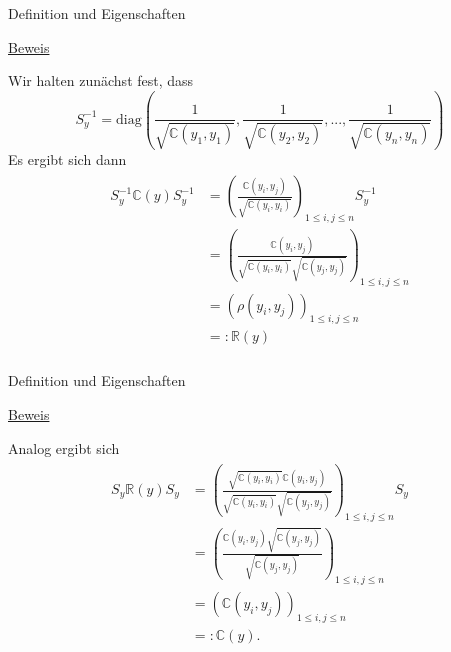 \documentclass[
  8pt,
  ignorenonframetext,
]{beamer}
\begin{document}
\begin{frame}{Definition und Eigenschaften}
\protect\hypertarget{definition-und-eigenschaften-2}{}
\footnotesize

\underline{Beweis}

Wir halten zunächst fest, dass \begin{equation}
S^{-1}_y = \mbox{diag}\left(\frac{1}{\sqrt{\mathbb{C}(y_1,y_1)}}, \frac{1}{\sqrt{\mathbb{C}(y_2,y_2)}}, ...,\frac{1}{\sqrt{\mathbb{C}(y_n,y_n)}}\right)
\end{equation} Es ergibt sich dann \begin{align}
\begin{split}
S_y^{-1}\mathbb{C}(y)S_y^{-1}
& = \left(\frac{\mathbb{C}(y_i,y_j)}{\sqrt{\mathbb{C}(y_i,y_i)}}\right)_{1 \le i,j \le n}S_y^{-1} \\
& = \left(\frac{\mathbb{C}(y_i,y_j)}{\sqrt{\mathbb{C}(y_i,y_i)}\sqrt{\mathbb{C}(y_j,y_j)}}\right)_{1 \le i,j \le n} \\
& = \left(\rho(y_i,y_j)\right)_{1 \le i,j \le n} \\
& =: \mathbb{R}(y) \\
\end{split}
\end{align}
\end{frame}

\begin{frame}{Definition und Eigenschaften}
\protect\hypertarget{definition-und-eigenschaften-3}{}
\footnotesize

\underline{Beweis}

Analog ergibt sich \begin{align}
\begin{split}
S_y\mathbb{R}(y)S_y
& = \left(\frac{\sqrt{\mathbb{C}(y_i,y_i)}\mathbb{C}(y_i,y_j)}{\sqrt{\mathbb{C}(y_i,y_i)}\sqrt{\mathbb{C}(y_j,y_j)}}\right)_{1 \le i,j \le n} S_y\\
& = \left(\frac{\mathbb{C}(y_i,y_j)\sqrt{\mathbb{C}(y_j,y_j)}}{\sqrt{\mathbb{C}(y_j,y_j)}}\right)_{1 \le i,j \le n}\\
& = \left(\mathbb{C}(y_i,y_j)\right)_{1 \le i,j \le n}\\
& =: \mathbb{C}(y). \\
\end{split}
\end{align}
\end{frame}
\end{document}
